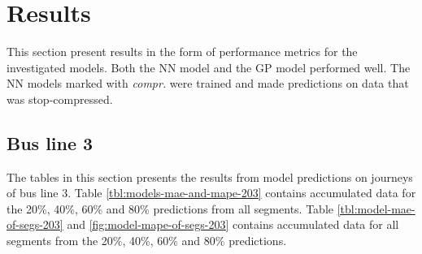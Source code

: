 
\captionsetup{width=.75\textwidth}


\chapter{Results}
\label{cha:results}
This section present results in the form of performance metrics for the investigated models. Both the NN model and the GP model performed well. The NN models marked with \emph{compr.} were trained and made predictions on data that was stop-compressed.

\section{Bus line 3}
The tables in this section presents the results from model predictions on journeys of bus line 3. Table \ref{tbl:models-mae-and-mape-203} contains accumulated data for the 20\%, 40\%, 60\% and 80\% predictions from all segments. Table \ref{tbl:model-mae-of-segs-203} and \ref{fig:model-mape-of-segs-203} contains accumulated data for all segments from the 20\%, 40\%, 60\% and 80\% predictions.
 
